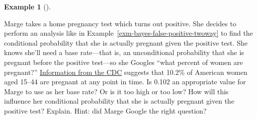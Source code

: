 \documentclass[
  letterpaper,
  DIV=11,
  numbers=noendperiod]{scrreprt}
\theoremstyle{plain}
\theoremstyle{definition}
\newtheorem{example}{Example}[chapter]
\theoremstyle{definition}
\theoremstyle{definition}
\theoremstyle{remark}
\begin{document}
\begin{tcolorbox}[enhanced jigsaw, opacityback=0, left=2mm, colframe=quarto-callout-note-color-frame, toprule=.15mm, breakable, colback=white, leftrule=.75mm, arc=.35mm, rightrule=.15mm, bottomrule=.15mm]

\begin{example}[]\protect\hypertarget{exm-base-rate-pregnancy}{}\label{exm-base-rate-pregnancy}

Marge takes a home pregnancy test which turns out positive. She decides
to perform an analysis like in
Example~\ref{exm-bayes-false-positive-twoway} to find the conditional
probability that she is actually pregnant given the positive test. She
knows she'll need a base rate---that is, an unconditional probability
that she is pregnant before the positive test---so she Googles ``what
percent of women are pregnant?''
\href{https://www.cdc.gov/nchs/products/databriefs/db136.htm}{Information
from the CDC} suggests that 10.2\% of American women aged 15--44 are
pregnant at any point in time. Is 0.102 an appropriate value for Marge
to use as her base rate? Or is it too high or too low? How will this
influence her conditional probability that she is actually pregnant
given the positive test? Explain. Hint: did Marge Google the right
question?

\end{example}

\end{tcolorbox}
\end{document}
